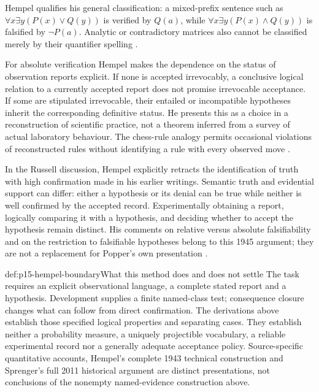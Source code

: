 Hempel qualifies his general classification: a mixed-prefix sentence such
as $\forall x\exists y(P(x)\lor Q(y))$ is verified by $Q(a)$, while
$\forall x\exists y(P(x)\land Q(y))$ is falsified by $\neg P(a)$.
Analytic or contradictory matrices also cannot be classified merely by
their quantifier spelling
\parencite[II, \S10, pp.~112--114 and p.~113, n.~1]{Hempel1945ConfirmationII}.

For absolute verification Hempel makes the dependence on the status of
observation reports explicit. If none is accepted irrevocably, a conclusive
logical relation to a currently accepted report does not promise irrevocable
acceptance. If some are stipulated irrevocable, their entailed or
incompatible hypotheses inherit the corresponding definitive status.
He presents this as a choice in a reconstruction of scientific practice,
not a theorem inferred from a survey of actual laboratory behaviour.
The chess-rule analogy permits occasional violations of reconstructed rules
without identifying a rule with every observed move
\parencite[II, pp.~114--119]{Hempel1945ConfirmationII}.

In the Russell discussion, Hempel explicitly retracts the identification
of truth with high confirmation made in his earlier writings. Semantic
truth and evidential support can differ: either a hypothesis or its denial
can be true while neither is well confirmed by the accepted record.
Experimentally obtaining a report, logically comparing it with a hypothesis,
and deciding whether to accept the hypothesis remain distinct. His comments
on relative versus absolute falsifiability and on the restriction to
falsifiable hypotheses belong to this 1945 argument; they are not a
replacement for Popper's own presentation
\parencite[II, pp.~115--116, n.~2; pp.~119--121]{Hempel1945ConfirmationII}.

\begin{proofboundary}{def:p15-hempel-boundary}{What this method does and does not settle}
The task requires an explicit observational language, a complete stated
report and a hypothesis. Development supplies a finite named-class test;
consequence closure changes what can follow from direct confirmation.
The derivations above establish those specified logical properties and
separating cases. They establish neither a probability measure, a uniquely
projectible vocabulary, a reliable experimental record nor a generally
adequate acceptance policy. Source-specific quantitative accounts,
Hempel's complete 1943 technical construction and Sprenger's full 2011
historical argument are distinct presentations, not conclusions of the
nonempty named-evidence construction above.
\end{proofboundary}

